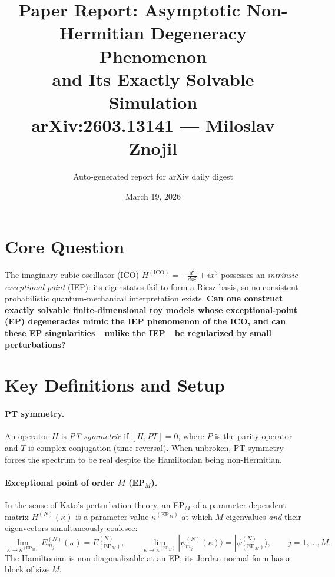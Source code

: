 \documentclass[11pt,a4paper]{article}
\title{Paper Report: Asymptotic Non-Hermitian Degeneracy Phenomenon\\and Its Exactly Solvable Simulation\\[6pt]\normalsize arXiv:2603.13141 --- Miloslav Znojil}
\author{Auto-generated report for arXiv daily digest}
\date{March 19, 2026}
\begin{document}
\maketitle

\section{Core Question}

The imaginary cubic oscillator (ICO) $H^{(\mathrm{ICO})} = -\frac{d^2}{dx^2} + ix^3$ possesses an \emph{intrinsic exceptional point} (IEP): its eigenstates fail to form a Riesz basis, so no consistent probabilistic quantum-mechanical interpretation exists.
\textbf{Can one construct exactly solvable finite-dimensional toy models whose exceptional-point (EP) degeneracies mimic the IEP phenomenon of the ICO, and can these EP singularities---unlike the IEP---be regularized by small perturbations?}

\section{Key Definitions and Setup}

\paragraph{PT symmetry.}
An operator $H$ is \emph{PT-symmetric} if $[H, PT] = 0$, where $P$ is the parity operator and $T$ is complex conjugation (time reversal).  When unbroken, PT symmetry forces the spectrum to be real despite the Hamiltonian being non-Hermitian.

\paragraph{Exceptional point of order $M$ (EP$_M$).}
In the sense of Kato's perturbation theory, an EP$_M$ of a parameter-dependent matrix $H^{(N)}(\kappa)$ is a parameter value $\kappa^{(\mathrm{EP}_M)}$ at which $M$ eigenvalues \emph{and} their eigenvectors simultaneously coalesce:
\[
  \lim_{\kappa \to \kappa^{(\mathrm{EP}_M)}} E_{m_j}^{(N)}(\kappa) = E^{(N)}_{(\mathrm{EP}_M)}, \qquad
  \lim_{\kappa \to \kappa^{(\mathrm{EP}_M)}} |\psi_{m_j}^{(N)}(\kappa)\rangle = |\psi^{(N)}_{(\mathrm{EP}_M)}\rangle, \qquad j=1,\dots,M.
\]
The Hamiltonian is non-diagonalizable at an EP; its Jordan normal form has a block of size $M$.
\end{document}
